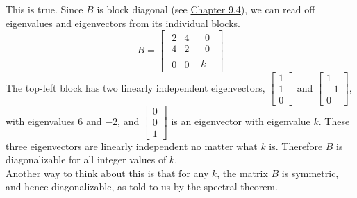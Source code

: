 \documentclass[11pt]{article}
\begin{document}
\begin{prob}[(12 pts)]
\begin{subprob}
 

\begin{solution}
This is true. Since $B$ is block diagonal (see \href{https://notes.eecs245.org/eigenvalues-and-eigenvectors/multiplicities-diagonalization/\#example-another-diagonalizable-matrix}{Chapter 9.4}), we can read off eigenvalues and eigenvectors from its individual blocks.
\[
B=
\left[
\begin{array}{c|c}
\begin{array}{cc}
2 & 4 \\
4 & 2
\end{array}
& 
\begin{array}{c}
0 \\ 0
\end{array}
\\
\hline
\begin{array}{cc}
0 & 0
\end{array}
& 
\boxed{k}
\end{array}
\right]
\]
The top-left block has two linearly independent eigenvectors, $\begin{bmatrix}1\\1\\0\end{bmatrix}$ and $\begin{bmatrix}1\\-1\\0\end{bmatrix}$, with eigenvalues $6$ and $-2$, and $\begin{bmatrix}0\\0\\1\end{bmatrix}$ is an eigenvector with eigenvalue $k$. These three eigenvectors are linearly independent no matter what $k$ is. Therefore $B$ is diagonalizable for all integer values of $k$. \\

Another way to think about this is that for any $k$, the matrix $B$ is symmetric, and hence diagonalizable, as told to us by the spectral theorem.
\end{solution}
\end{subprob}
\end{prob}

\newpage
\end{document}
